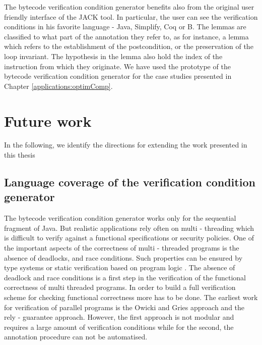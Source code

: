 The bytecode verification condition generator benefits also from the original user friendly interface of the JACK tool.  In particular, 
the user can see the verification conditions in his favorite language - Java, Simplify, Coq or B. The lemmas are classified 
to what part of the annotation they refer to, as for instance, a lemma which refers to the establishment of the postcondition, or the preservation of the loop invariant.
The hypothesis in the lemma also hold the index of the instruction from which they originate. 
We have used the prototype of the bytecode verification condition generator for the case studies presented in Chapter \ref{applications:optimComp}.


\section{Future work}
In the following, we identify the directions for extending the work presented in this thesis

\subsection{Language coverage of the verification condition generator}
The bytecode verification condition generator works only for the sequential fragment of Java. But realistic applications 
rely often on multi - threading which is difficult to verify against a functional specifications or security policies.
One of the important aspects of the correctness of multi - threaded programs is the absence of deadlocks, 
and race conditions. Such properties can be ensured  by type systems \cite{FA99TSL,flanagan00typebased} or static verification based on program logic \cite{FLL02ESC}.  
The absence of deadlock and race conditions is a first step in the verification of the functional correctness of multi threaded programs. In order to build a full 
verification scheme for checking functional correctness more has to be done.
The earliest work for  verification of  parallel programs is  the Owicki and Gries approach   
\cite{nipkow99owickigries}  and the rely - guarantee approach. However, 
the first approach is not modular and requires a large amount of verification conditions while for the second, the annotation procedure can not be automatised.

